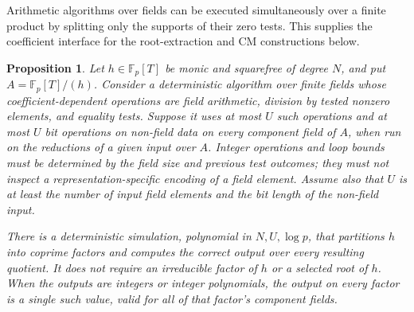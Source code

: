 \documentclass[11pt]{article}
\newtheorem{proposition}[theorem]{Proposition}
\theoremstyle{definition}
\theoremstyle{remark}
\begin{document}
Arithmetic algorithms over fields can be executed simultaneously
over a finite product by splitting only the supports of their zero
tests. This supplies the coefficient interface for the root-extraction
and CM constructions below.

\begin{proposition}\label{prop:etale-arithmetic-simulation}
Let \(h\in\mathbb F_p[T]\) be monic and squarefree of degree \(N\),
and put \(A=\mathbb F_p[T]/(h)\).
Consider a deterministic algorithm over finite fields whose
coefficient-dependent operations are field arithmetic, division by
tested nonzero elements, and equality tests. Suppose it uses at most
\(U\) such operations and at most \(U\) bit operations on
non-field data on every component field of \(A\), when run on
the reductions of a given input over \(A\). Integer operations and
loop bounds must be determined by the field size and previous
test outcomes; they must not inspect a representation-specific
encoding of a field element.
Assume also that \(U\) is at least the number of input field
elements and the bit length of the non-field input.

There is a deterministic simulation, polynomial in
\(N,U,\log p\), that partitions \(h\) into coprime factors and
computes the correct output over every resulting quotient. It
does not require an irreducible factor of \(h\) or a selected root
of \(h\). When the outputs are integers or integer polynomials,
the output on every factor is a single such value, valid for all
of that factor's component fields.
\end{proposition}
\end{document}

